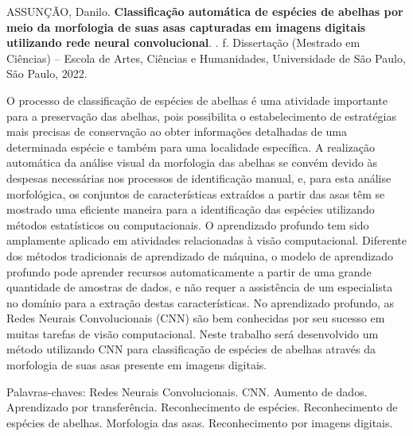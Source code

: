 \documentclass[
	12pt,				%
	oneside,			%
	a4paper,			%
	english,			%
	brazil				%
	]{abntex2ppgsi}
\begin{document}

\setlength{\absparsep}{18pt} %
\begin{resumo}

% 
%
% 
%
\begin{flushleft}
ASSUNÇÃO, Danilo. \textbf{Classificação automática de espécies de abelhas por meio da morfologia de suas asas capturadas em imagens digitais utilizando rede neural convolucional}. \imprimirdata. \pageref{LastPage} f. Dissertação (Mestrado em Ciências) – Escola de Artes, Ciências e Humanidades, Universidade de São Paulo, São Paulo, 2022.
\end{flushleft}

O processo de classificação de espécies de abelhas é uma atividade importante para a preservação das abelhas, pois possibilita o estabelecimento de estratégias mais precisas de conservação ao obter informações detalhadas de uma determinada espécie e também para uma localidade específica. A realização automática da análise visual da morfologia das abelhas se convém devido às despesas necessárias nos processos de identificação manual, e, para esta análise morfológica, os conjuntos de características extraídos a partir das asas têm se mostrado uma eficiente maneira para a identificação das espécies utilizando métodos estatísticos ou computacionais. O aprendizado profundo tem sido amplamente aplicado em atividades relacionadas à visão computacional. Diferente dos métodos tradicionais de aprendizado de máquina, o modelo de aprendizado profundo pode aprender recursos automaticamente a partir de uma grande quantidade de amostras de dados, e não requer a assistência de um especialista no domínio para a extração destas características. No aprendizado profundo, as Redes Neurais Convolucionais (CNN) são bem conhecidas por seu sucesso em muitas tarefas de visão computacional. Neste trabalho será desenvolvido um método utilizando CNN para classificação de espécies de abelhas através da morfologia de suas asas presente em imagens digitais.

Palavras-chaves: Redes Neurais Convolucionais. CNN. Aumento de dados. Aprendizado por transferência. Reconhecimento de espécies. Reconhecimento de espécies de abelhas. Morfologia das asas. Reconhecimento por imagens digitais.
\end{resumo}
\end{document}
